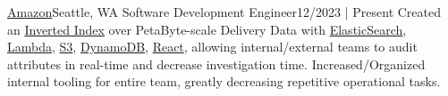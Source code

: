 \resumeSubheading
{\href{https://www.amazon.jobs/en/teams/last-mile}{Amazon}}{Seattle, WA}
{Software Development Engineer}{12/2023 | Present}
\resumeItemListStart
{}
{Created an \href{https://en.wikipedia.org/wiki/Inverted_index}{Inverted Index} over PetaByte-scale Delivery Data with \href{https://aws.amazon.com/opensearch-service/}{ElasticSearch}, \href{https://aws.amazon.com/lambda/}{Lambda}, \href{https://aws.amazon.com/s3/}{S3}, \href{https://aws.amazon.com/dynamodb/}{DynamoDB}, \href{https://react.dev/}{React}, allowing internal/external teams to audit attributes in real-time and decrease investigation time.}
{Increased/Organized internal tooling for entire team, greatly decreasing repetitive operational tasks.}
\resumeItemListEnd
